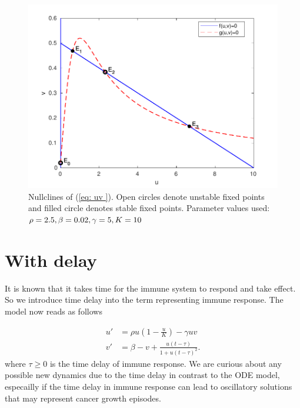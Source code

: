 \documentclass{aims}
\theoremstyle{definition}
\begin{document}
\begin{figure}[tph]
\begin{centering}
\includegraphics[scale=0.6]{explore/plots/nullclines/nullclines-new}
\par\end{centering}
\caption{\label{fig:Nullclines}Nullclines of (\ref{eq: uv }). Open circles
denote unstable fixed points and filled circle denotes stable fixed
points. Parameter values used: $\rho=2.5,\text{\ensuremath{\beta=0.02,\gamma=5,K=10}}$ }
\end{figure}


\section{With delay}

It is known that it takes time for the immune system to respond and
take effect. So we introduce time delay into the term representing
immune response. The model now reads as follows 

\begin{subequations}\label{eq:main delay}
\begin{align}
u' & =\rho u(1-\frac{u}{K})-\gamma uv\\
v' & =\beta-v+\frac{u(t-\tau)}{1+u(t-\tau)^{2}}.
\end{align}
\end{subequations}
where $\tau \ge 0$ is the time delay of immune response. We are curious about any possible new dynamics due to the time delay in contrast to the ODE model, especailly if the time delay in immune response can lead to oscillatory solutions that may represent cancer growth episodes. 
\end{document}
